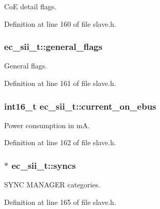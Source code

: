 \-Co\-E detail flags. 



\-Definition at line 160 of file slave.\-h.

\subsubsection[{general\-\_\-flags}]{ {\bf ec\-\_\-sii\-\_\-t\-::general\-\_\-flags}}\label{structec__sii__t_a7ff70e83d0e1870bc344218f53f85aaf}


\-General flags. 



\-Definition at line 161 of file slave.\-h.

\subsubsection[{current\-\_\-on\-\_\-ebus}]{\setlength{\rightskip}{0pt plus 5cm}int16\-\_\-t {\bf ec\-\_\-sii\-\_\-t\-::current\-\_\-on\-\_\-ebus}}\label{structec__sii__t_a67585e573f37806a5c34923354874838}


\-Power consumption in m\-A. 



\-Definition at line 162 of file slave.\-h.

\subsubsection[{syncs}]{$\ast$ {\bf ec\-\_\-sii\-\_\-t\-::syncs}}\label{structec__sii__t_a1cfcfe4bdca850f302cbb8938affa7b9}


\-S\-Y\-N\-C \-M\-A\-N\-A\-G\-E\-R categories. 



\-Definition at line 165 of file slave.\-h.

